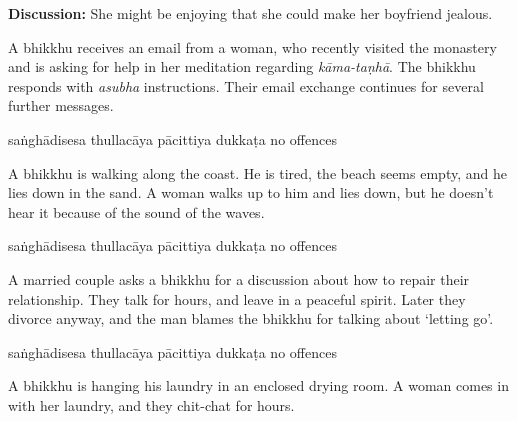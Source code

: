 \begin{exam}{\autoExamName}
\begin{problem*}
\begin{parts}
  \bigskip

  \textbf{Discussion:} She might be enjoying that she could make her boyfriend jealous.

  \bigskip

\item A bhikkhu receives an email from a woman, who recently visited the
  monastery and is asking for help in her meditation regarding \textit{kāma-taṇhā}.
  The bhikkhu responds with \textit{asubha} instructions. Their email exchange
  continues for several further messages.

  \bigskip

  \begin{answers}{5}
    \bChoices
     saṅghādisesa\eAns
     thullacāya\eAns
     pācittiya\eAns
     dukkaṭa\eAns
     no offences\eAns
    \eChoices
  \end{answers}
  
  \bigskip

\item A bhikkhu is walking along the coast. He is tired, the beach seems empty,
  and he lies down in the sand. A woman walks up to him and lies down, but he
  doesn't hear it because of the sound of the waves.

  \bigskip

  \begin{answers}{5}
    \bChoices
     saṅghādisesa\eAns
     thullacāya\eAns
     pācittiya\eAns
     dukkaṭa\eAns
     no offences\eAns
    \eChoices
  \end{answers}

  \bigskip

\item A married couple asks a bhikkhu for a discussion about how to repair their
  relationship. They talk for hours, and leave in a peaceful spirit. Later they
  divorce anyway, and the man blames the bhikkhu for talking about `letting go'.

  \bigskip

  \begin{answers}{5}
    \bChoices
     saṅghādisesa\eAns
     thullacāya\eAns
     pācittiya\eAns
     dukkaṭa\eAns
     no offences\eAns
    \eChoices
  \end{answers}

  \bigskip

\item A bhikkhu is hanging his laundry in an enclosed drying room. A woman comes in with
  her laundry, and they chit-chat for hours.


\end{parts}
\end{problem*}
\end{exam}
